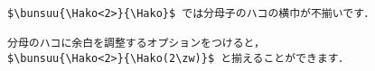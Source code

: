 \begin{verbatim}
$\bunsuu{\Hako<2>}{\Hako}$ では分母子のハコの横巾が不揃いです．

分母のハコに余白を調整するオプションをつけると，
$\bunsuu{\Hako<2>}{\Hako(2\zw)}$ と揃えることができます．
\end{verbatim}
